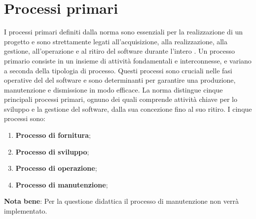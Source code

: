 \section{Processi primari}
\label{sec:Processi_Primari}
I processi primari definiti dalla norma  sono essenziali per la realizzazione di un progetto e sono strettamente legati all'acquisizione, alla realizzazione, alla gestione, all'operazione e al ritiro del software durante l'intero . 
Un processo primario consiste in un insieme di attività fondamentali e interconnesse, e variano a seconda della tipologia di processo.
Questi processi sono cruciali nelle fasi operative del  del software e sono determinanti per garantire una produzione, manutenzione e dismissione in modo efficace. La norma distingue cinque principali processi primari, ognuno dei quali comprende attività chiave per lo sviluppo e la gestione del software, dalla sua concezione fino al suo ritiro.
I cinque processi sono:
\begin{enumerate}
    \item \textbf{Processo di fornitura}; 
    \item \textbf{Processo di sviluppo};
    \item \textbf{Processo di operazione}; 
    \item \textbf{Processo di manutenzione};
\end{enumerate}
\textbf{Nota bene}: Per la questione didattica il processo di manutenzione non verrà implementato.



